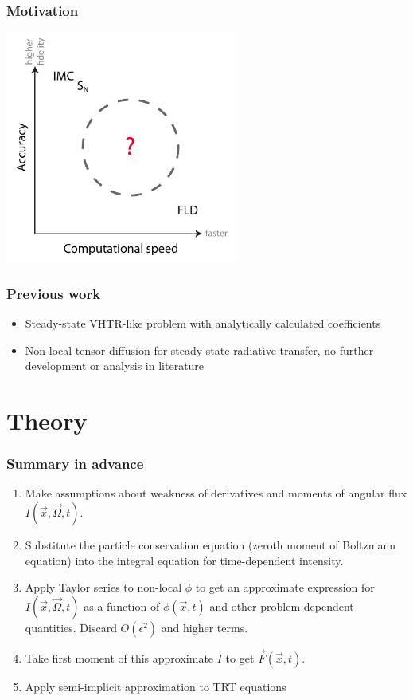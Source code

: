 \documentclass{beamer}
\begin{document}
\begin{frame}
  \frametitle{Motivation}
\begin{center}
  \includegraphics[width=3in]{../figures/fidelity}
\end{center}
\end{frame}
\begin{frame}
  \frametitle{Previous work}
  \begin{itemize}
    \item Steady-state VHTR-like problem with analytically calculated
      coefficients \cite{Lar2009c}
    \item Non-local tensor diffusion \cite{Mor2007} for steady-state
      radiative transfer, no further development or
      analysis in literature
  \end{itemize}
\end{frame}
\section{Theory}
\begin{frame}
  \frametitle{Summary in advance}
  \begin{enumerate}
    \item Make assumptions about weakness of derivatives and moments of angular
      flux $I(\vec{x}, \vec{\Omega}, t)$. %
    \item Substitute the particle conservation equation (zeroth moment of
      Boltzmann equation) into the integral equation for time-dependent
      intensity.
    \item Apply Taylor series to non-local $\phi$ to get an approximate
      expression for $I(\vec{x}, \vec{\Omega}, t)$ as a function of
      $\phi(\vec{x}, t)$ and other problem-dependent quantities.
      Discard $O(\epsilon^2)$ and higher terms.
    \item Take first moment of this approximate $I$ to get
      $\vec{F}(\vec{x}, t)$.
    \item Apply semi-implicit approximation to TRT equations
  \end{enumerate}
\end{frame}
\end{document}
